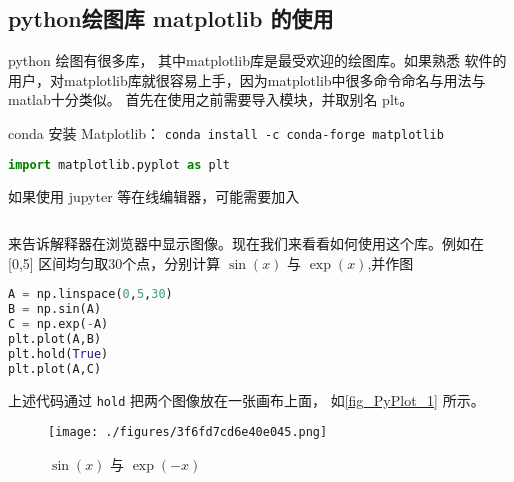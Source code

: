 
\subsection{python绘图库 matplotlib 的使用}

python 绘图有很多库， 其中matplotlib库是最受欢迎的绘图库。如果熟悉  软件的用户，对matplotlib库就很容易上手，因为matplotlib中很多命令命名与用法与matlab十分类似。 首先在使用之前需要导入模块，并取别名 plt。

conda 安装 Matplotlib： \verb`conda install -c conda-forge matplotlib`

\begin{lstlisting}[language=python]
import matplotlib.pyplot as plt
\end{lstlisting}
如果使用 jupyter 等在线编辑器，可能需要加入
\begin{lstlisting}[language=python]
% matplotlib inline
\end{lstlisting}
来告诉解释器在浏览器中显示图像。现在我们来看看如何使用这个库。例如在 [0,5] 区间均匀取30个点，分别计算 $\sin(x)$ 与 $\exp(x)$,并作图
\begin{lstlisting}[language=python]
A = np.linspace(0,5,30) 
B = np.sin(A)
C = np.exp(-A)
plt.plot(A,B)
plt.hold(True)
plt.plot(A,C)
\end{lstlisting}
上述代码通过 \verb`hold` 把两个图像放在一张画布上面， 如\autoref{fig_PyPlot_1} 所示。
\begin{figure}[ht]
\centering
\texttt{[image: ./figures/3f6fd7cd6e40e045.png]}
\caption{$\sin(x)$ 与 $\exp{(-x)}$} \label{fig_PyPlot_1}
\end{figure}


